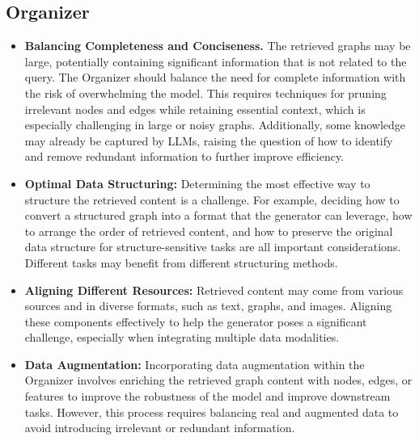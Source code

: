 \subsection{Organizer} 
\begin{itemize}[leftmargin=*]
    \item \textbf{Balancing Completeness and Conciseness.} The retrieved graphs may be large, potentially containing significant information that is not related to the query. The Organizer should balance the need for complete information with the risk of overwhelming the model. This requires techniques for pruning irrelevant nodes and edges while retaining essential context, which is especially challenging in large or noisy graphs. Additionally, some knowledge may already be captured by LLMs, raising the question of how to identify and remove redundant information to further improve efficiency. \\ 
    
    \item \textbf{Optimal Data Structuring:} Determining the most effective way to structure the retrieved content is a challenge. For example, deciding how to convert a structured graph into a format that the generator can leverage, how to arrange the order of retrieved content, and how to preserve the original data structure for structure-sensitive tasks are all important considerations. Different tasks may benefit from different structuring methods. \\
    
    \item \textbf{Aligning Different Resources:} Retrieved content may come from various sources and in diverse formats, such as text, graphs, and images. Aligning these components effectively to help the generator poses a significant challenge, especially when integrating multiple data modalities. \\
    
    \item \textbf{Data Augmentation: } Incorporating data augmentation within the Organizer involves enriching the retrieved graph content with nodes, edges, or features to improve the robustness of the model and improve downstream tasks. However, this process requires balancing real and augmented data to avoid introducing irrelevant or redundant information.
\end{itemize}  
    
